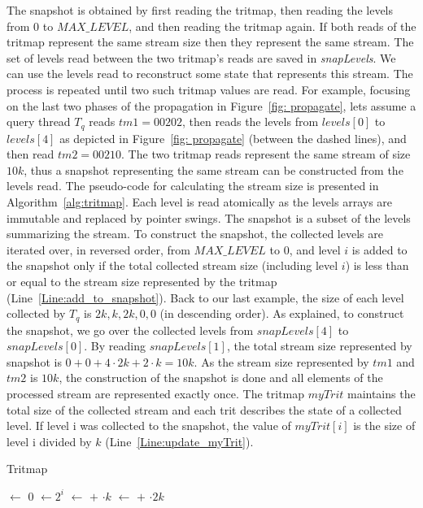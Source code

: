 The snapshot is obtained by first reading the tritmap, then reading the levels from $0$ to $\mathit{MAX\_LEVEL}$, and then reading the tritmap again. If both reads of the tritmap represent the same stream size then they represent the same stream. The set of levels read between the two tritmap's reads are saved in \emph{snapLevels}. We can use the levels read to reconstruct some state that represents this stream. The process is repeated until two such tritmap values are read. For example, focusing on the last two phases of the propagation in Figure~\ref{fig: propagate}, lets assume a query thread $T_q$ reads $tm1=00202$, then reads the levels from $\mathit{levels}[0]$ to $\mathit{levels}[4]$ as depicted in Figure~\ref{fig: propagate} (between the dashed lines), and then read $tm2=00210$. The two tritmap reads represent the same stream of size $10k$, thus a snapshot representing the same stream can be constructed from the levels read. The pseudo-code for calculating the stream size is presented in Algorithm~\ref{alg:tritmap}. Each level is read atomically as the levels arrays are immutable and replaced by pointer swings. The snapshot is a subset of the levels summarizing the stream. To construct the snapshot, the collected levels are iterated over, in reversed order, from $\mathit{MAX\_LEVEL}$ to $0$, and level $i$ is added to the snapshot only if the total collected stream size (including level $i$) is less than or equal to the stream size represented by the tritmap (Line~\ref{Line:add_to_snapshot}). Back to our last example, the size of each level collected by $T_q$ is ${2k,k,2k,0,0}$ (in descending order). As explained, to construct the snapshot, we go over the collected levels from $\mathit{snapLevels}[4]$ to $\mathit{snapLevels}[0]$. By reading $snapLevels[1]$, the total stream size represented by snapshot is $0+0+4\cdot2k+2\cdot k = 10k$. As the stream size represented by $tm1$ and $tm2$ is $10k$, the construction of the snapshot is done and all elements of the processed stream are represented exactly once. The tritmap $\mathit{myTrit}$ maintains the total size of the collected stream and each trit describes the state of a collected level. If level i was collected to the snapshot, the value of $\mathit{myTrit[i]}$ is the size of level i divided by $k$ (Line~\ref{Line:update_myTrit}). 

 
\begin{algorithm}[h]
\caption{Tritmap} \label{alg:tritmap}
\begin{algorithmic}[1]
\setcounter{ALG@line}{\value{mycounter}}
        \State {} $\gets$ 0
            \State {} $\gets 2^i $
                \State {} $\gets$  $+$ $\cdot k$
                     \State {} $\gets$  $+$ $\cdot 2k$
            \EndIf
        \EndFor
        \State {}
\EndProcedure
\setcounter{mycounter}{\value{ALG@line}}
\end{algorithmic}
\end{algorithm}
 
